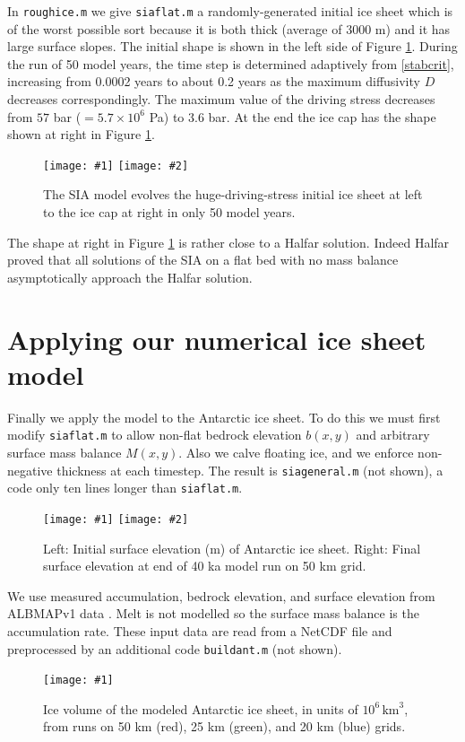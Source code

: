 \documentclass[letterpaper,final,12pt,reqno]{amsart}
\newcommand{\onefigsize}[3]{
\begin{figure}[ht]
\centering
\texttt{[image: \#1]}
\caption{#2}
\label{fig:#1}
\end{figure}}
\newcommand{\onefig}[2]{\onefigsize{#1}{#2}{3.0in}}
\newcommand{\twofigsizes}[5]{
\begin{figure}[ht]
\centering
\texttt{[image: \#1]} \quad
\texttt{[image: \#2]}
\caption{#3}
\label{fig:#1}
\end{figure}}
\newcommand{\twofig}[3]{\twofigsizes{#1}{#2}{#3}{2.5in}{2.5in}}
\begin{document}
In \texttt{roughice.m} we give \texttt{siaflat.m} a randomly-generated initial ice sheet which is of the worst possible sort because it is both thick (average of 3000 m) and it has large surface slopes.  The initial shape is shown in the left side of Figure \ref{fig:roughinitial}.  During the run of 50 model years, the time step is determined adaptively from \eqref{stabcrit}, increasing from 0.0002 years to about 0.2 years as the maximum diffusivity $D$ decreases correspondingly.  The maximum value of the driving stress decreases from $57$ bar ($= 5.7\times 10^6$ Pa) to $3.6$ bar.  At the end the ice cap has the shape shown at right in Figure \ref{fig:roughinitial}.

\twofig{roughinitial}{roughfinal}{The SIA model evolves the huge-driving-stress initial ice sheet at left to the ice cap at right in only 50 model years.}

The shape at right in Figure \ref{fig:roughinitial} is rather close to a Halfar solution.  Indeed Halfar proved that all solutions of the SIA on a flat bed with no mass balance asymptotically approach the Halfar solution.


\section{Applying our numerical ice sheet model}

Finally we apply the model to the Antarctic ice sheet.  To do this we must first modify \texttt{siaflat.m} to allow non-flat bedrock elevation $b(x,y)$ and arbitrary surface mass balance $M(x,y)$.  Also we calve floating ice, and we enforce non-negative thickness at each timestep.  The result is \texttt{siageneral.m} (not shown), a code only ten lines longer than \texttt{siaflat.m}.

\twofigsizes{antinitial}{antfinal}{Left: Initial surface elevation (m) of Antarctic ice sheet.  Right: Final surface elevation at end of 40 ka model run on 50 km grid.}{2.55in}{3.2in}

We use measured accumulation, bedrock elevation, and surface elevation from ALBMAPv1 data \cite{LeBrocqetal2010}.  Melt is not modelled so the surface mass balance is the accumulation rate.  These input data are read from a NetCDF file and preprocessed by an additional code \texttt{buildant.m} (not shown).

\onefig{antvolcompare}{Ice volume of the modeled Antarctic ice sheet, in units of $10^6 \, \text{km}^3$, from runs on 50 km (red), 25 km (green), and 20 km (blue) grids.}
\end{document}
